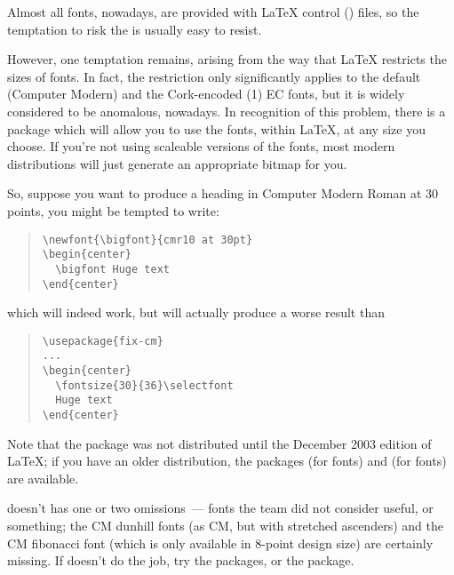 Almost all fonts, nowadays, are provided with \LaTeX{} control
() files, so the temptation to risk the
 is usually easy to
resist.

However, one temptation remains, arising from the way that \LaTeX{}
restricts the sizes of fonts.  In fact, the restriction only
significantly applies to the default (Computer Modern) and the
Cork-encoded (1) EC fonts, but it is widely considered to be
anomalous, nowadays.  In recognition of this problem, there is a
package  which will allow you to use the fonts, within
\LaTeX{}, at any size you choose.  If you're not using scaleable
versions of the fonts, most modern distributions will just generate an
appropriate bitmap for you.

So, suppose you want to produce a heading in Computer Modern Roman at
30 points, you might be tempted to write:
\begin{quote}
\begin{verbatim}
\newfont{\bigfont}{cmr10 at 30pt}
\begin{center}
  \bigfont Huge text
\end{center}
\end{verbatim}
\end{quote}
which will indeed work, but will actually produce a worse result than
\begin{quote}
\begin{verbatim}
\usepackage{fix-cm}
...
\begin{center}
  \fontsize{30}{36}\selectfont
  Huge text
\end{center}
\end{verbatim}
\end{quote}
Note that the  package was not distributed until the
December 2003 edition of \LaTeX{}; if you have an older distribution,
the packages  (for  fonts) and
 (for  fonts) are available.

 doesn't has one or two omissions~--- fonts the \latex{}
team did not consider useful, or something; the CM dunhill fonts (as
CM, but with stretched ascenders) and the CM fibonacci font (which is only
available in 8-point design size) are certainly missing.  If
 doesn't do the job, try the 
packages, or the  package.

